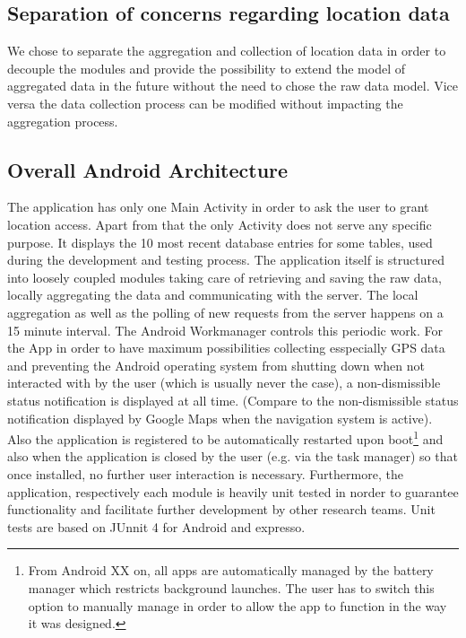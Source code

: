 \subsection{Separation of concerns regarding location data}
We chose to separate the aggregation and collection of location data in order to decouple the modules and provide the possibility to extend the model of aggregated data in the future without the need to chose the raw data model. Vice versa the data collection process can be modified without impacting the aggregation process.

\subsection{Overall Android Architecture}
The application has only one Main Activity in order to ask the user to grant location access. Apart from that the only Activity does not serve any specific purpose. It displays the 10 most recent database entries for some tables, used during the development and testing process.
The application itself is structured into loosely coupled modules taking care of retrieving and saving the raw data, locally aggregating the data and communicating with the server.
The local aggregation as well as the polling of new requests from the server happens on a 15 minute interval. The Android Workmanager controls this periodic work.
For the App in order to have maximum possibilities collecting esspecially GPS data and preventing the Android operating system from shutting down when not interacted with by the user (which is usually never the case), a non-dismissible status notification is displayed at all time. (Compare to the non-dismissible status notification displayed by Google Maps when the navigation system is active). Also the application is registered to be automatically restarted upon boot\footnote{From Android XX on, all apps are automatically managed by the battery manager which restricts background launches. The user has to switch this option to manually manage in order to allow the app to function in the way it was designed.} and also when the application is closed by the user (e.g. via the task manager) so that once installed, no further user interaction is necessary.
Furthermore, the application, respectively each module is heavily unit tested in norder to guarantee functionality and facilitate further development by other research teams. Unit tests are based on JUnnit 4 for Android and expresso.

